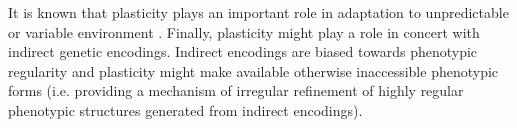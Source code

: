 It is known that plasticity plays an important role in adaptation to unpredictable or variable environment \cite{Fusco2010PhenotypicConcepts}. Finally, plasticity might play a role in concert with indirect genetic encodings. Indirect encodings are biased towards phenotypic regularity \cite{Clune2011OnRegularity} and plasticity might make available otherwise inaccessible phenotypic forms (i.e. providing a mechanism of irregular refinement of highly regular phenotypic structures generated from indirect encodings).



